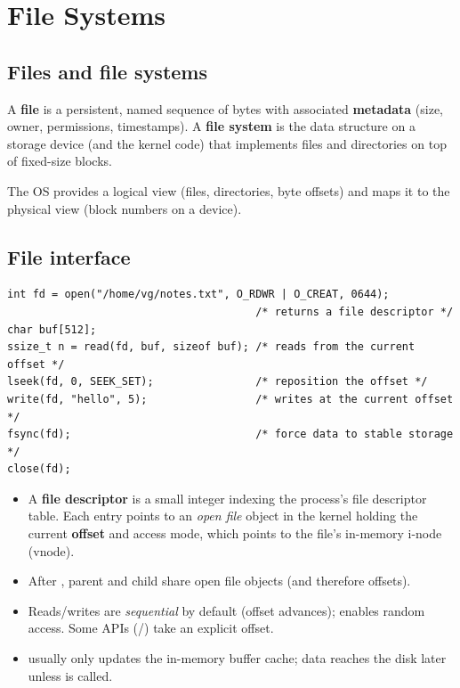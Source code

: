 \chapter{File Systems}

\section{Files and file systems}

\begin{definition}
A \textbf{file} is a persistent, named sequence of bytes with associated \textbf{metadata}
(size, owner, permissions, timestamps). A \textbf{file system} is the data structure on a storage
device (and the kernel code) that implements files and directories on top of fixed-size blocks.
\end{definition}

The OS provides a logical view (files, directories, byte offsets) and maps it to the physical
view (block numbers on a device).

\section{File interface}

\begin{lstlisting}[style=c]
int fd = open("/home/vg/notes.txt", O_RDWR | O_CREAT, 0644);
                                       /* returns a file descriptor */
char buf[512];
ssize_t n = read(fd, buf, sizeof buf); /* reads from the current offset */
lseek(fd, 0, SEEK_SET);                /* reposition the offset */
write(fd, "hello", 5);                 /* writes at the current offset */
fsync(fd);                             /* force data to stable storage */
close(fd);
\end{lstlisting}

\begin{itemize}
  \item A \textbf{file descriptor} is a small integer indexing the process's file descriptor
    table. Each entry points to an \emph{open file} object in the kernel holding the current
    \textbf{offset} and access mode, which points to the file's in-memory i-node (vnode).
  \item After , parent and child share open file objects (and therefore offsets).
  \item Reads/writes are \emph{sequential} by default (offset advances);  enables
    random access. Some APIs (/) take an explicit offset.
  \item {} usually only updates the in-memory buffer cache; data reaches the disk later
    unless  is called.
\end{itemize}

